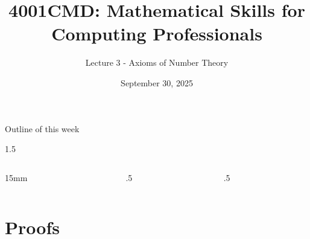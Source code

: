 \documentclass[11pt,aspectratio=1610,handout]{beamer}
\title{4001CMD: Mathematical Skills for Computing Professionals}
\subtitle{Lecture 3 - Axioms of Number Theory}
\date{September 30, 2025}
\begin{document}
	
	\begin{frame}
		\titlepage
	\end{frame}
	

\hypersetup{linkcolor=blue}
\begin{frame}{Outline of this week}
\begin{spacing}{1.5}
	\begin{columns}[t]
		\begin{column}{15mm}
			~
		\end{column}
		\begin{column}{.5\textwidth}
			\tableofcontents[sections={1-7}]
		\end{column}
		\begin{column}{.5\textwidth}
			\tableofcontents[sections={8-14}]
		\end{column}
	\end{columns}

	\end{spacing}
\end{frame}
\hypersetup{linkcolor=mygray}	


	
\section{Proofs}
\end{document}
